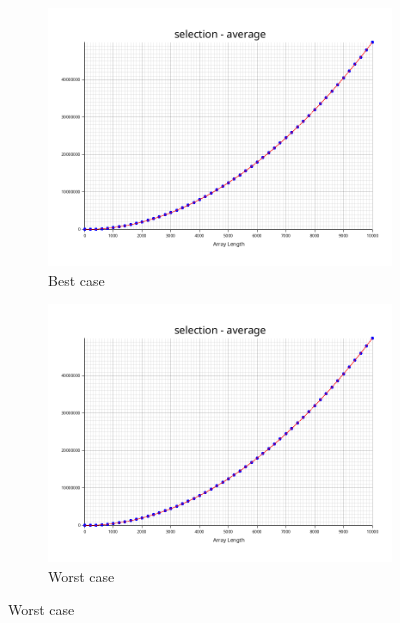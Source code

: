 \documentclass[a4paper]{article}
\begin{document}
\begin{figure}[h]
  \begin{subfigure}[b]{0.4\textwidth}
    \includegraphics[width=\textwidth]{../plots/selection-average.png}
    \caption{Best case}
    \label{fig:selection-best}
  \end{subfigure}
  \begin{subfigure}[b]{0.4\textwidth}
    \includegraphics[width=\textwidth]{../plots/selection-average.png}
    \caption{Worst case}
    \label{fig:selection-worst}
  \end{subfigure}
\end{figure}
\end{document}
